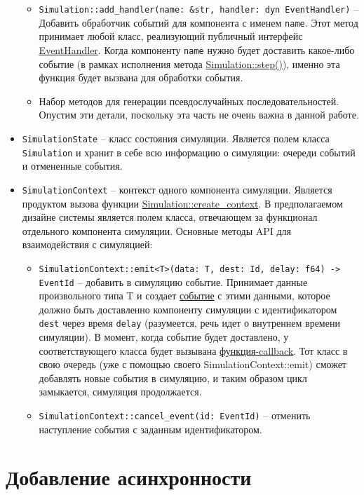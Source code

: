 \begin{itemize}
\begin{itemize}
        \item \texttt{Simulation::add\_handler(name: \&str, handler: dyn EventHandler)} -- Добавить обработчик событий для компонента с именем \texttt{name}.
        Этот метод принимает любой класс, реализующий публичный интерфейс \hyperref[EventHandler]{EventHandler}. Когда компоненту \texttt{name} нужно будет доставить какое-либо событие (в рамках исполнения метода \hyperref[Simulation::step]{Simulation::step()}), именно эта функция будет вызвана для обработки события.
        \item Набор методов для генерации псевдослучайных последовательностей. Опустим эти детали, поскольку эта часть не очень важна в данной работе.
    \end{itemize}
    \item \texttt{SimulationState} -- класс состояния симуляции. Является полем класса \texttt{Simulation} и хранит в себе всю информацию о симуляции: очереди событий и отмененные события.
    \item \texttt{SimulationContext} -- контекст одного компонента симуляции. Является продуктом вызова функции \hyperref[Simulation::createcontext]{Simulation::create\_context}. В предполагаемом дизайне системы является полем класса, отвечающем за функционал отдельного компонента симуляции. Основные методы API для взаимодействия с симуляцией:
    \begin{itemize}
        \item \texttt{SimulationContext::emit<T>(data: T, dest: Id, delay: f64) -> EventId} -- добавить в симуляцию событие. Принимает данные произвольного типа T и создает \hyperref[Event]{событие} с этими данными, которое должно быть доставленно компоненту симуляции с идентификатором \texttt{dest} через время \texttt{delay} (разумеется, речь идет о внутреннем времени симуляции). В момент, когда событие будет доставлено, у соответствующего класса будет вызывана \hyperref[fnon]{функция-callback}. Тот класс в свою очередь (уже с помощью своего SimulationContext::emit) сможет добавлять новые события в симуляцию, и таким образом цикл замыкается, симуляция продолжается.
        \item \texttt{SimulationContext::cancel\_event(id: EventId)} -- отменить наступление события с заданным идентификатором.
    \end{itemize}
\end{itemize}

\section{Добавление асинхронности}

